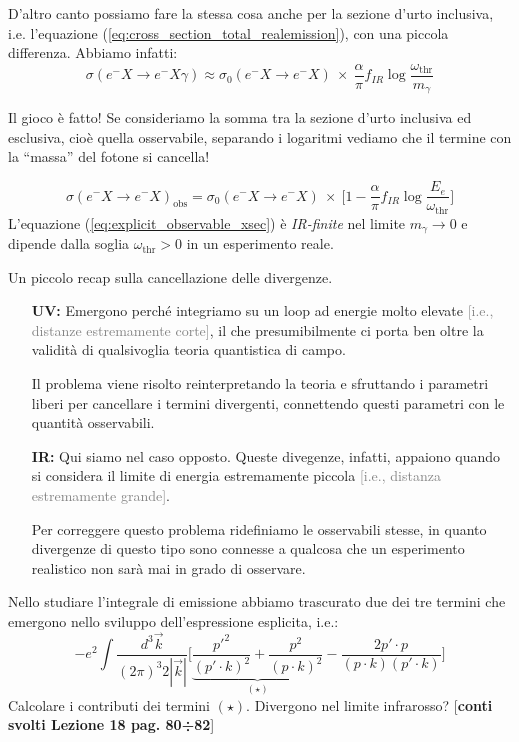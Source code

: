 \documentclass[../main.tex]{subfiles}
\begin{document}
D'altro canto possiamo fare la stessa cosa anche per la sezione d'urto inclusiva, i.e. l'equazione (\ref{eq:cross_section_total_realemission}), con una piccola differenza. Abbiamo infatti:
\[
\sigma(e^-X\rightarrow e^-X\gamma) \approx \sigma_0(e^-X\rightarrow e^-X)~\times~\frac{\alpha}{\pi} f_{IR}\log\frac{\omega_\text{thr}}{m_\gamma}
\]

Il gioco è fatto! Se consideriamo la somma tra la sezione d'urto inclusiva ed esclusiva, cioè quella osservabile, separando i logaritmi vediamo che il termine con la “massa” del fotone si cancella!

\begin{equation}
    \boxed{
    \sigma(e^-X\rightarrow e^-X)_\text{obs} = \sigma_0(e^-X\rightarrow e^-X)~\times~\bigg[ 1-\frac{\alpha}{\pi} f_{IR}\log\frac{E_e}{\omega_\text{thr}}\bigg]
    }
    \label{eq:explicit_observable_xsec}
\end{equation}
L'equazione (\ref{eq:explicit_observable_xsec}) è \textit{IR-finite} nel limite \(m_\gamma\rightarrow 0\) e dipende dalla soglia \(\omega_\text{thr}>0\) in un esperimento reale. 

\begin{nota}
    Un piccolo recap sulla cancellazione delle divergenze.
    \begin{enumerate}
        \item[\textbf{UV:}] Emergono perché integriamo su un loop ad energie molto elevate \textcolor{gray}{[i.e., distanze estremamente corte]}, il che presumibilmente ci porta ben oltre la validità di qualsivoglia teoria quantistica di campo. 

        Il problema viene risolto reinterpretando la teoria e sfruttando i parametri liberi per cancellare i termini divergenti, connettendo questi parametri con le quantità osservabili.\\
        
        \item[\textbf{IR:}] Qui siamo nel caso opposto. Queste divegenze, infatti, appaiono quando si considera il limite di energia estremamente piccola \textcolor{gray}{[i.e., distanza estremamente grande]}. 
        
        Per correggere questo problema ridefiniamo le osservabili stesse, in quanto divergenze di questo tipo sono connesse a qualcosa che un esperimento realistico non sarà mai in grado di osservare.
    \end{enumerate}
\end{nota}

\begin{exercise}
    Nello studiare l'integrale di emissione abbiamo trascurato due dei tre termini che emergono nello sviluppo dell'espressione esplicita, i.e.: 
    \[
    -e^2\int \frac{d^3\Vec{k}}{(2\pi)^3 2|\Vec{k}|}\bigg[\underbrace{\frac{p'^2}{(p'\cdot k)^2} + \frac{p^2}{(p\cdot k)^2}}_{(\star)} -\frac{2p'\cdot p}{(p\cdot k)(p'\cdot k)}\bigg]
    \]
    Calcolare i contributi dei termini \((\star)\). Divergono nel limite infrarosso?
    [\textbf{conti svolti Lezione 18 pag. 80÷82}]
\end{exercise}
\end{document}

